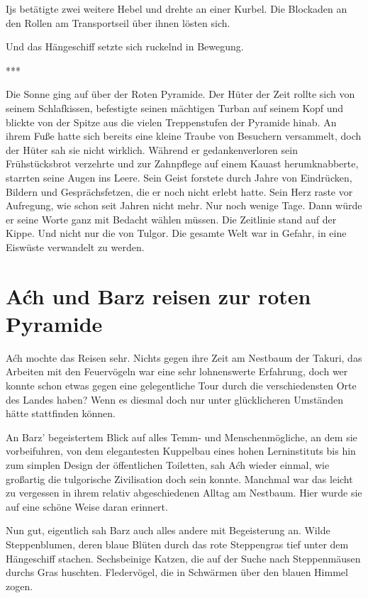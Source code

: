 Ijs betätigte zwei weitere Hebel und drehte an einer Kurbel. Die Blockaden an den Rollen am Transportseil über ihnen lösten sich.

Und das Hängeschiff setzte sich ruckelnd in Bewegung.\bigskip



***\bigskip


Die Sonne ging auf über der Roten Pyramide. Der Hüter der Zeit rollte sich von seinem Schlafkissen, befestigte seinen mächtigen Turban auf seinem Kopf und blickte von der Spitze aus die vielen Treppenstufen der Pyramide hinab. An ihrem Fuße hatte sich bereits eine kleine Traube von Besuchern versammelt, doch der Hüter sah sie nicht wirklich. Während er gedankenverloren sein Frühstücksbrot verzehrte und zur Zahnpflege auf einem Kauast herumknabberte, starrten seine Augen ins Leere. Sein Geist forstete durch Jahre von Eindrücken, Bildern und Gesprächsfetzen, die er noch nicht erlebt hatte. Sein Herz raste vor Aufregung, wie schon seit Jahren nicht mehr. Nur noch wenige Tage. Dann würde er seine Worte ganz mit Bedacht wählen müssen. Die Zeitlinie stand auf der Kippe. Und nicht nur die von Tulgor. Die gesamte Welt war in Gefahr, in eine Eiswüste verwandelt zu werden.





\newpage
\section{Aćh und Barz reisen zur roten Pyramide}



Aćh mochte das Reisen sehr. Nichts gegen ihre Zeit am Nestbaum der Takuri, das Arbeiten mit den Feuervögeln war eine sehr lohnenswerte Erfahrung, doch wer konnte schon etwas gegen eine gelegentliche Tour durch die verschiedensten Orte des Landes haben? Wenn es diesmal doch nur unter glücklicheren Umständen hätte stattfinden können.

An Barz’ begeistertem Blick auf alles Temm- und Menschenmögliche, an dem sie vorbeifuhren, von dem elegantesten Kuppelbau eines hohen Lerninstituts bis hin zum simplen Design der öffentlichen Toiletten, sah Aćh wieder einmal, wie großartig die tulgorische Zivilisation doch sein konnte. Manchmal war das leicht zu vergessen in ihrem relativ abgeschiedenen Alltag am Nestbaum. Hier wurde sie auf eine schöne Weise daran erinnert.

Nun gut, eigentlich sah Barz auch alles andere mit Begeisterung an. Wilde Steppenblumen, deren blaue Blüten durch das rote Steppengras tief unter dem Hängeschiff stachen. Sechsbeinige Katzen, die auf der Suche nach Steppenmäusen durchs Gras huschten. Fledervögel, die in Schwärmen über den blauen Himmel zogen.

